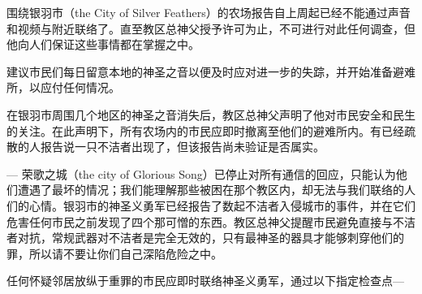 
\begin{scpbox}

围绕银羽市（the City of Silver Feathers）的农场报告自上周起已经不能通过声音和视频与附近联络了。直至教区总神父授予许可为止，不可进行对此任何调查，但他向人们保证这些事情都在掌握之中。

建议市民们每日留意本地的神圣之音以便及时应对进一步的失踪，并开始准备避难所，以应付任何情况。

\end{scpbox}


\begin{scpbox}

在银羽市周围几个地区的神圣之音消失后，教区总神父声明了他对市民安全和民生的关注。在此声明下，所有农场内的市民应即时撤离至他们的避难所内。有已经疏散的人报告说一只不洁者出现了，但该报告尚未验证是否属实。

\end{scpbox}


\begin{scpbox}

— 荣歌之城（the city of Glorious Song）已停止对所有通信的回应，只能认为他们遭遇了最坏的情况；我们能理解那些被困在那个教区内，却无法与我们联络的人们的心情。银羽市的神圣义勇军已经报告了数起不洁者入侵城市的事件，并在它们危害任何市民之前发现了四个那可憎的东西。教区总神父提醒市民避免直接与不洁者对抗，常规武器对不洁者是完全无效的，只有最神圣的器具才能够刺穿他们的罪，所以请不要让你们自己深陷危险之中。

任何怀疑邻居放纵于重罪的市民应即时联络神圣义勇军，通过以下指定检查点—

\end{scpbox}


